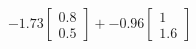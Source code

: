 \documentclass[preview]{standalone}
\begin{document}
\begin{align*}
-1.73 \begin{bmatrix} 0.8 \\ 0.5 \end{bmatrix} + -0.96 \begin{bmatrix} 1 \\ 1.6 \end{bmatrix}
\end{align*}
\end{document}
